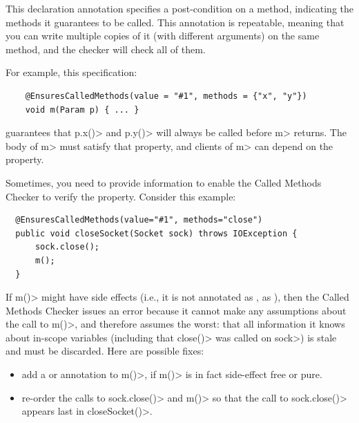 \begin{description}
\label{called-methods-ensurescalledmethods}
\item[\refqualclass{checker/calledmethods/qual}{EnsuresCalledMethods}]
  This declaration annotation specifies a post-condition on a method, indicating the methods it
  guarantees to be called. This annotation is repeatable, meaning that you can write
  multiple copies of it (with different arguments) on the same method, and the checker will check all of them.

  For example, this specification:

  \begin{Verbatim}
    @EnsuresCalledMethods(value = "#1", methods = {"x", "y"})
    void m(Param p) { ... }
  \end{Verbatim}

  guarantees that \<p.x()> and \<p.y()> will always be called before \<m> returns.
  The body of \<m> must satisfy that property, and clients of \<m> can depend on the property.

  Sometimes, you need to provide information to enable the Called Methods
  Checker to verify the property.
  Consider this example:
  \begin{Verbatim}
  @EnsuresCalledMethods(value="#1", methods="close")
  public void closeSocket(Socket sock) throws IOException {
      sock.close();
      m();
  }
  \end{Verbatim}

  If \<m()> might have side effects (i.e., it is not annotated
  as ,
  as ),
  then the Called Methods Checker issues an error because
  it cannot make any assumptions about the call to \<m()>, and therefore assumes
  the worst: that all information it knows about in-scope variables (including
  that \<close()> was called on \<sock>) is stale and must be discarded.
  Here are possible fixes:

  \begin{itemize}
  \item add a  or
   annotation to \<m()>, if \<m()> is
    in fact side-effect free or pure.

  \item re-order the calls to \<sock.close()> and \<m()> so that the call
    to \<sock.close()> appears last in \<closeSocket()>.
  \end{itemize}


\end{description}
